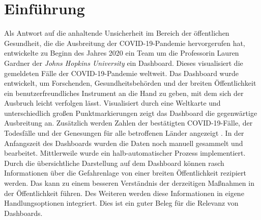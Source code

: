 \chapter{Einführung}
Als Antwort auf die anhaltende Unsicherheit im Bereich der öffentlichen Gesundheit, die die Ausbreitung der COVID-19-Pandemie hervorgerufen hat, 
entwickelte zu Beginn des Jahres 2020 ein Team um die Professorin Lauren Gardner der \textit{Johns Hopkins University} ein Dashboard. 
Dieses visualisiert die gemeldeten Fälle der COVID-19-Pandemie weltweit. Das Dashboard wurde entwickelt, um Forschenden, Gesundheitsbehörden und der breiten Öffentlichkeit 
ein benutzerfreundliches Instrument an die Hand zu geben, mit dem sich der Ausbruch leicht verfolgen lässt.
Visualisiert durch eine Weltkarte und unterschiedlich großen Punktmarkierungen zeigt das Dashboard die gegenwärtige Ausbreitung an.
Zusätzlich werden Zahlen der bestätigten COVID-19-Fälle, der Todesfälle und der Genesungen für alle betroffenen Länder angezeigt \cite[vgl.][533]{dong_interactive_2020}.
In der Anfangszeit des Dashboards wurden die Daten noch manuell gesammelt und bearbeitet. Mittlerweile wurde ein halb-automatischer Prozess implementiert.
Durch die übersichtliche Darstellung auf dem Dashboard können rasch Informationen über die Gefahrenlage von einer breiten Öffentlichkeit
rezipiert werden. Das kann zu einem besseren Verständnis der derzeitigen Maßnahmen in der Öffentlichkeit führen. Des Weiteren werden diese Informationen
in eigene Handlungsoptionen integriert. Dies ist ein guter Beleg für die Relevanz von Dashboards.



